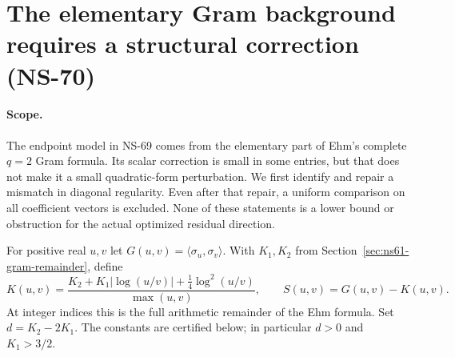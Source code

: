 \section{The elementary Gram background requires a structural correction (NS-70)}
\label{sec:ns70-background}

\paragraph{Scope.}
The endpoint model in NS-69 comes from the elementary part of Ehm's
complete $q=2$ Gram formula. Its scalar correction is small in some
entries, but that does not make it a small quadratic-form perturbation.
We first identify and repair a mismatch in diagonal regularity. Even
after that repair, a uniform comparison on all coefficient vectors is
excluded. None of these statements is a lower bound or obstruction
for the actual optimized residual direction.

For positive real $u,v$ let $G(u,v)=\langle\sigma_u,\sigma_v\rangle$.
With $K_1,K_2$ from Section~\ref{sec:ns61-gram-remainder}, define
\[
 K(u,v)=\frac{K_2+K_1|\log(u/v)|+\tfrac14\log^2(u/v)}{\max(u,v)},
 \qquad S(u,v)=G(u,v)-K(u,v).
\]
At integer indices this is the full arithmetic remainder of the Ehm
formula. Set $d=K_2-2K_1$. The constants are certified below; in
particular $d>0$ and $K_1>3/2$.

